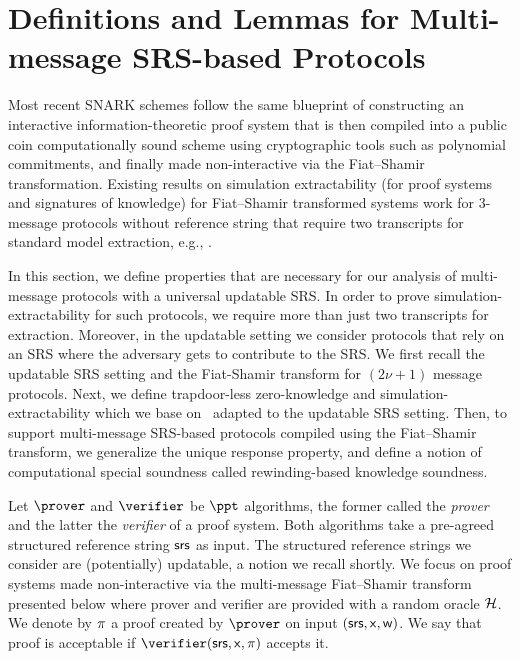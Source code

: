 \section{Definitions and Lemmas for Multi-message SRS-based Protocols}
\label{sec:se_definitions}
\label{sec:preliminaries}



Most recent SNARK schemes follow the same blueprint of constructing an interactive information-theoretic proof system 
that is then compiled into a public coin computationally sound scheme using cryptographic tools such as polynomial commitments,
and finally made non-interactive via the Fiat--Shamir transformation.
Existing results on simulation extractability (for proof systems and
signatures of knowledge) for Fiat--Shamir transformed systems work for $3$-message protocols without reference string that
require two transcripts for standard model extraction, e.g.,
\cite{JC:PoiSte00,INDOCRYPT:FKMV12,C:RotSeg21}.

In this section, we define properties that are necessary for our
analysis of multi-message protocols with a universal updatable SRS.  In order to
prove simulation-extractability for such protocols, we require more than just two
transcripts for extraction. Moreover, in the updatable setting we consider protocols
that rely on an SRS where the adversary gets to contribute to the SRS. We first recall the updatable SRS setting and the Fiat-Shamir transform for $(2\nu+1)$ message protocols.
Next, we define trapdoor-less zero-knowledge and simulation-extractability
which we base on~\cite{INDOCRYPT:FKMV12} adapted to the updatable SRS setting. Then,
to support multi-message SRS-based protocols compiled using the Fiat--Shamir transform,
we generalize the unique response property, and define a notion of computational special
soundness called rewinding-based knowledge soundness.\medskip


\noindent Let $\prover$ and $\verifier$ be $\ppt$ algorithms, the former called the \emph{prover}
and the latter the \emph{verifier} of a proof system. Both algorithms take a pre-agreed structured reference string $\mathsf{srs}$ as input. The structured reference strings we consider are (potentially) updatable, a notion we recall shortly.
%
We focus on proof systems made non-interactive via the multi-message Fiat--Shamir transform presented below where prover and
verifier are provided with a random oracle $\mathcal{H}$. 
We denote by $\pi$ a proof created by $\prover$ on input
$(\mathsf{srs}, \mathsf{x}, \mathsf{w})$. We say that proof is acceptable if $\verifier(\srs, \inp,
\zkproof)$ accepts it.



